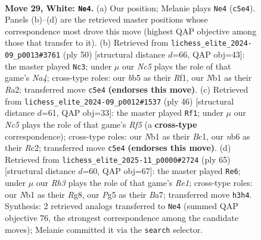\documentclass[11pt]{article}
\begin{document}
\clearpage

\begin{figure}[p]\centering
\begin{subfigure}{0.46\textwidth}\centering
\resizebox{\linewidth}{!}{%
\newchessgame
\chessboard[
  setfen={r5k1/4rppp/1n2p3/pbNn2P1/8/1P2P2R/P5PP/RN1B2K1 w - - 7 29},
  showmover=false,
  pgfstyle=straightmove, color=movearrow, markmove={c5-e4}
]}
\caption{}
\end{subfigure}\hfill
\begin{subfigure}{0.46\textwidth}\centering
\resizebox{\linewidth}{!}{%
\newchessgame
\chessboard[
  setfen={2r4k/2p2ppp/pp1n4/3p4/NPnP2P1/4P3/R4P1P/5RK1 w - - 0 26},
  showmover=false,
  pgfstyle=straightmove, color=movearrow, markmove={a4-c3}
]}
\caption{}
\end{subfigure}
\\[4pt]
\begin{subfigure}{0.46\textwidth}\centering
\resizebox{\linewidth}{!}{%
\newchessgame
\chessboard[
  setfen={1k2r3/1pn3p1/p1nr1p1p/2N1pR2/8/PP2P1P1/2R1P1KP/2B5 w - - 1 24},
  showmover=false,
  pgfstyle=straightmove, color=movearrow, markmove={f5-f1}
]}
\caption{}
\end{subfigure}\hfill
\begin{subfigure}{0.46\textwidth}\centering
\resizebox{\linewidth}{!}{%
\newchessgame
\chessboard[
  setfen={2k1r1r1/bpp3p1/6np/1P2p2n/p3P2P/B1PN1NP1/P1K4R/4R3 b - - 3 33},
  showmover=false,
  pgfstyle=straightmove, color=movearrow, markmove={e8-e6}
]}
\caption{}
\end{subfigure}
\caption{\textbf{Move 29, White: \texttt{Ne4}.} (a) Our position; Melanie plays \texttt{Ne4} (\texttt{c5e4}). Panels (b)--(d) are the retrieved master positions whose correspondence most drove this move (highest QAP objective among those that transfer to it). (b) Retrieved from \texttt{lichess\_elite\_2024-09\_p0013\#3761} (ply 50) [structural distance $d$=66, QAP obj=43]: the master played \texttt{Nc3}; under $\mu$ our \emph{Nc5} plays the role of that game's \emph{Na4}; cross-type roles: our \emph{b}b5 as their \emph{R}f1, our \emph{N}b1 as their \emph{R}a2; transferred move \texttt{c5e4} \textbf{(endorses this move)}. (c) Retrieved from \texttt{lichess\_elite\_2024-09\_p0012\#1537} (ply 46) [structural distance $d$=61, QAP obj=33]: the master played \texttt{Rf1}; under $\mu$ our \emph{Nc5} plays the role of that game's \emph{Rf5} (a \textbf{cross-type} correspondence); cross-type roles: our \emph{N}b1 as their \emph{B}c1, our \emph{n}b6 as their \emph{R}c2; transferred move \texttt{c5e4} \textbf{(endorses this move)}. (d) Retrieved from \texttt{lichess\_elite\_2025-11\_p0000\#2724} (ply 65) [structural distance $d$=60, QAP obj=67]: the master played \texttt{Re6}; under $\mu$ our \emph{Rh3} plays the role of that game's \emph{Re1}; cross-type roles: our \emph{N}b1 as their \emph{R}g8, our \emph{P}g5 as their \emph{B}a7; transferred move \texttt{h3h4}. Synthesis: 2 retrieved analogs transferred to \texttt{Ne4} (summed QAP objective 76, the strongest correspondence among the candidate moves); Melanie committed it via the \texttt{search} selector.}
\label{fig:thought-m56}
\end{figure}
\end{document}

